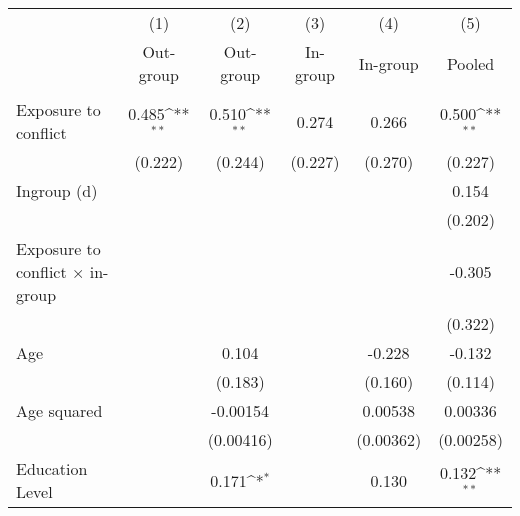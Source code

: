 {
\def\sym#1{\ifmmode^{#1}\else\(^{#1}\)\fi}
\begin{tabular}{l*{5}{c}}
\hline\hline
                    &\multicolumn{1}{c}{(1)}&\multicolumn{1}{c}{(2)}&\multicolumn{1}{c}{(3)}&\multicolumn{1}{c}{(4)}&\multicolumn{1}{c}{(5)}\\
                    &\multicolumn{1}{c}{Out-group}&\multicolumn{1}{c}{Out-group}&\multicolumn{1}{c}{In-group}&\multicolumn{1}{c}{In-group}&\multicolumn{1}{c}{Pooled}\\
\hline
                    &                     &                     &                     &                     &                     \\
Exposure to conflict&       0.485\sym{**} &       0.510\sym{**} &       0.274         &       0.266         &       0.500\sym{**} \\
                    &     (0.222)         &     (0.244)         &     (0.227)         &     (0.270)         &     (0.227)         \\
[1em]
Ingroup (d)         &                     &                     &                     &                     &       0.154         \\
                    &                     &                     &                     &                     &     (0.202)         \\
[1em]
Exposure to conflict × in-group&                     &                     &                     &                     &      -0.305         \\
                    &                     &                     &                     &                     &     (0.322)         \\
[1em]
Age                 &                     &       0.104         &                     &      -0.228         &      -0.132         \\
                    &                     &     (0.183)         &                     &     (0.160)         &     (0.114)         \\
[1em]
Age squared         &                     &    -0.00154         &                     &     0.00538         &     0.00336         \\
                    &                     &   (0.00416)         &                     &   (0.00362)         &   (0.00258)         \\
[1em]
Education Level     &                     &       0.171\sym{*}  &                     &       0.130         &       0.132\sym{**} \\

\end{tabular}}
